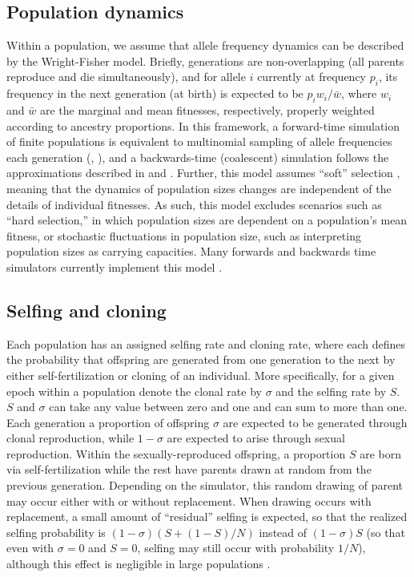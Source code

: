 \documentclass[11pt]{article}
\begin{document}
\subsection{Population dynamics}
\label{sec:appendix-population-dynamics}
Within a population, we assume that allele frequency dynamics can
be described by the Wright-Fisher model.
Briefly, generations are non-overlapping (all parents
reproduce and die simultaneously), and for allele $i$ currently at frequency $p_i$,
its frequency in the next generation (at birth) is expected to be $p_iw_i/\bar{w}$,
where $w_i$ and $\bar{w}$ are the marginal and
mean fitnesses, respectively, properly weighted according to ancestry proportions.
In this framework,
a forward-time simulation of finite populations is equivalent
to multinomial sampling of allele frequencies each
generation (\citet[][pp 29-31]{burger2000-ul}, \citet[][pp 179-181]{crowkimura1970}),
and a backwards-time (coalescent) simulation follows the approximations
described in \citet{tajima1983evolutionary,hudson1983testing}
and \citet[][chapter 3]{wakeley2008-hd}.
Further, this model assumes ``soft'' selection \citep{christiansen1975hard},
meaning that the dynamics of population sizes
changes are independent of the details of individual fitnesses.
As such, this model excludes scenarios such as ``hard selection,''
in which population sizes are dependent on a population's mean fitness, or
stochastic fluctuations in population size, such as interpreting
population sizes as carrying capacities.
Many forwards and backwards time simulators currently implement this model
\citep[e.g.,][]{hudson2002generating,gutenkunst2009inferring,excoffier2011fastsimcoal,kelleher2016efficient,jouganous2017inferring,haller2019slim,thornton2019-nu}.

\subsection{Selfing and cloning}

Each population has an assigned selfing rate and cloning rate, where each defines
the probability that offspring are generated from one generation to the next by either
self-fertilization or cloning of an individual.
More specifically, for a given epoch within a population denote the clonal rate by
$\sigma$ and the selfing rate by $S$.
$S$ and $\sigma$ can take any value between zero and one and
can sum to more than one.
Each generation a proportion of offspring
$\sigma$ are expected to be generated through clonal reproduction,
while $1-\sigma$ are expected to arise through sexual reproduction.
Within the sexually-reproduced offspring,
a proportion
$S$ are born via self-fertilization while the rest
have parents drawn at random from the previous generation.
Depending on the simulator, this random drawing of parent may occur
either with or without replacement. When drawing occurs with replacement, a small
amount of ``residual'' selfing is expected, so that the realized selfing probability
is $(1-\sigma)(S + (1-S)/N)$ instead of $(1-\sigma)S$ (so that even with $\sigma=0$
and $S=0$, selfing may still occur with probability $1/N$), although
this effect is negligible in large populations \citep{nordborg1997coalescent}.
\end{document}
